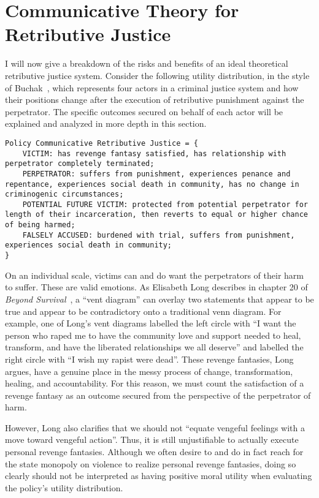 \documentclass{article}
\begin{document}
    \section{Communicative Theory for Retributive Justice}
        \label{communicative}

        I will now give a breakdown of the risks and benefits of an ideal theoretical retributive justice system. Consider the following utility distribution, in the style of Buchak~\cite{taking-risks-behind-the-veil-of-ignorance}, which represents four actors in a criminal justice system and how their positions change after the execution of retributive punishment against the perpetrator. The specific outcomes secured on behalf of each actor will be explained and analyzed in more depth in this section. 

\begin{lstlisting}[breaklines]
Policy Communicative Retributive Justice = {
    VICTIM: has revenge fantasy satisfied, has relationship with perpetrator completely terminated; 
    PERPETRATOR: suffers from punishment, experiences penance and repentance, experiences social death in community, has no change in criminogenic circumstances; 
    POTENTIAL FUTURE VICTIM: protected from potential perpetrator for length of their incarceration, then reverts to equal or higher chance of being harmed; 
    FALSELY ACCUSED: burdened with trial, suffers from punishment, experiences social death in community;
}
\end{lstlisting}

        On an individual scale, victims can and do want the perpetrators of their harm to suffer. These are valid emotions. As Elisabeth Long describes in chapter 20 of \textit{Beyond Survival}~\cite{beyond-survival}, a ``vent diagram'' can overlay two statements that appear to be true and appear to be contradictory onto a traditional venn diagram. For example, one of Long's vent diagrams labelled the left circle with ``I want the person who raped me to have the community love and support needed to heal, transform, and have the liberated relationships we all deserve'' and labelled the right circle with ``I wish my rapist were dead''. These revenge fantasies, Long argues, have a genuine place in the messy process of change, transformation, healing, and accountability. For this reason, we must count the satisfaction of a revenge fantasy as an outcome secured from the perspective of the perpetrator of harm. 

        However, Long also clarifies that we should not ``equate vengeful feelings with a move toward vengeful action''. Thus, it is still unjustifiable to actually execute personal revenge fantasies. Although we often desire to and do in fact reach for the state monopoly on violence to realize personal revenge fantasies, doing so clearly should not be interpreted as having positive moral utility when evaluating the policy's utility distribution. 
\end{document}

